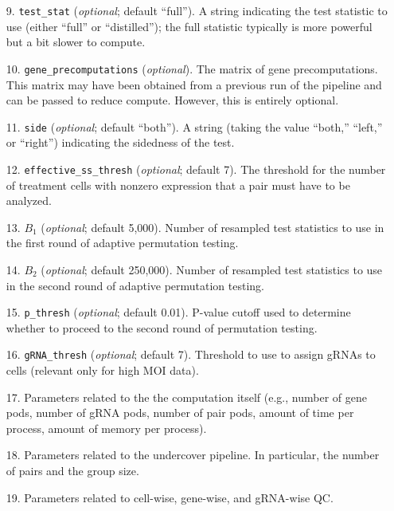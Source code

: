 \documentclass[12pt]{article}
\begin{document}
\begin{itemize}
\item[9.] \texttt{test\_stat} (\textit{optional}; default “full”). A string indicating the test statistic to use (either “full” or “distilled”); the full statistic typically is more powerful but a bit slower to compute.

\item[10.] \texttt{gene\_precomputations} (\textit{optional}). The matrix of gene precomputations. This matrix may have been obtained from a previous run of the pipeline and can be passed to reduce compute. However, this is entirely optional.  

\item[11.] \texttt{side} (\textit{optional}; default “both”). A string (taking the value “both,” “left,” or “right”) indicating the sidedness of the test.

\item[12.] \texttt{effective\_ss\_thresh} (\textit{optional}; default 7). The threshold for the number of treatment cells with nonzero expression that a pair must have to be analyzed.

\item[13.] $B_1$ (\textit{optional}; default 5,000). Number of resampled test statistics to use in the first round of adaptive permutation testing.

\item[14.] $B_2$ (\textit{optional}; default 250,000). Number of resampled test statistics to use in the second round of adaptive permutation testing. 

\item[15.] \texttt{p\_thresh} (\textit{optional}; default 0.01). P-value cutoff used to determine whether to proceed to the second round of permutation testing.

\item[16.] \texttt{gRNA\_thresh} (\textit{optional}; default 7). Threshold to use to assign gRNAs to cells (relevant only for high MOI data).

\item[17.] Parameters related to the the computation itself (e.g., number of gene pods, number of gRNA pods, number of pair pods, amount of time per process, amount of memory per process).

\item[18.] Parameters related to the undercover pipeline. In particular, the number of pairs and the group size.

\item[19.] Parameters related to cell-wise, gene-wise, and gRNA-wise QC. 

\end{itemize}
\end{document}
